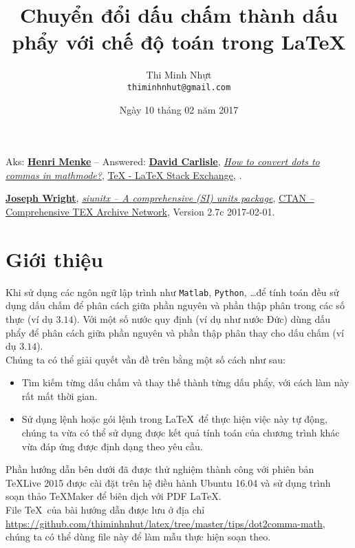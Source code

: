 \documentclass[12pt,a4paper]{article}
\title{\bfseries \huge Chuyển đổi dấu chấm thành dấu phẩy với chế độ toán trong \LaTeX}
\author{\Large Thi Minh Nhựt \bigskip \\  \Large \texttt{thiminhnhut@gmail.com}}
\date{\Large Ngày 10 tháng 02 năm 2017}
\begin{document}
\maketitle
\tableofcontents

\begin{thebibliography}{99}
   Aks: \href{https://goo.gl/AGFMFr}{\textbf{Henri Menke}} -- Answered: \href{https://goo.gl/nl1sm9}{\textbf{David Carlisle}}, \href{https://goo.gl/ZNH6ce}{\emph{How to convert dots to commas in mathmode?}}, \href{http://tex.stackexchange.com/}{TeX - LaTeX Stack Exchange}, .

   \href{https://www.ctan.org/author/wright}{\textbf{Joseph Wright}}, \href{https://www.ctan.org/pkg/siunitx}{\emph{siunitx – A comprehensive (SI) units package}}, \href{https://www.ctan.org/}{CTAN -- Comprehensive TEX Archive Network}, Version 2.7c 2017-02-01.
\end{thebibliography}

\section{Giới thiệu}
Khi sử dụng các ngôn ngữ lập trình như \Verb|Matlab|, \Verb|Python|, \ldots để tính toán đều sử dụng dấu chấm để phân cách giữa phần nguyên và phần thập phân trong các số thực (ví dụ $3.14$). Với một số nước quy định (ví dụ như nước Đức) dùng dấu phẩy để phân cách giữa phần nguyên và phần thập phân thay cho dấu chấm (ví dụ $\num{3.14}$).\\

Chúng ta có thể giải quyết vần đề trên bằng một số cách như sau:
\begin{itemize}
  \item Tìm kiếm từng dấu chấm và thay thế thành từng dấu phẩy, với cách làm này rất mất thời gian.

  \item Sử dụng lệnh hoặc gói lệnh trong \LaTeX\ để thực hiện việc này tự động, chúng ta vừa có thể sử dụng được kết quả tính toán của chương trình khác vừa đáp ứng được định dạng theo yêu cầu.
\end{itemize}

Phần hướng dẫn bên dưới đã được thử nghiệm thành công với phiên bản \TeX Live 2015 được cài đặt trên hệ điều hành Ubuntu 16.04 và sử dụng trình soạn thảo \TeX Maker để biên dịch với PDF \LaTeX. \\

File \TeX\ của bài hướng dẫn được lưu ở địa chỉ \url{https://github.com/thiminhnhut/latex/tree/master/tips/dot2comma-math}, chúng ta có thể dùng file này để làm mẫu thực hiện soạn theo.
\end{document}

